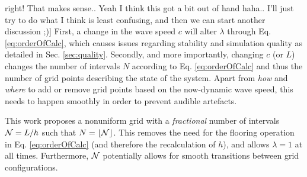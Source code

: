 \documentclass[fleqn]{jaes}
\begin{document}
right! That makes sense.. Yeah I think this got a bit out of hand haha.. I'll just try to do what I think is least confusing, and then we can start another discussion ;)] 
%
First, a change in the wave speed $c$ will alter $\lambda$ through Eq. \eqref{eq:orderOfCalc}, which causes issues regarding stability and simulation quality as detailed in Sec. \ref{sec:quality}. Secondly, and more importantly, changing $c$ (or $L$) changes the number of intervals $N$ according to Eq. \eqref{eq:orderOfCalc} and thus the number of grid points describing the state of the system. Apart from \textit{how} and \textit{where} to add or remove grid points based on the now-dynamic wave speed, this needs to happen smoothly in order to prevent audible artefacts. %

This work proposes a nonuniform grid with a \textit{fractional} number of intervals $\mathcal{N} = L / h$ such that $N = \floor[\Nfrac]$. This removes the need for the flooring operation in Eq. \eqref{eq:orderOfCalc} (and therefore the recalculation of $h$), and allows $\lambda = 1$ at all times. Furthermore, $\mathcal{N}$ potentially allows for smooth transitions between grid configurations. 
\end{document}
